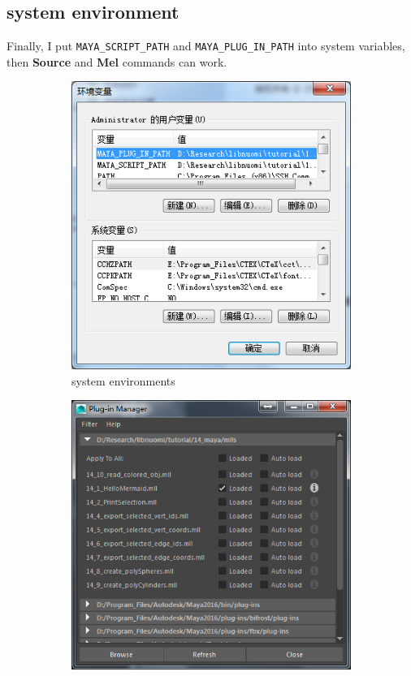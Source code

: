 \subsection{system environment}
Finally, I put \lstinline|MAYA_SCRIPT_PATH| and \lstinline|MAYA_PLUG_IN_PATH| into system variables, then \textbf{Source} and \textbf{Mel} commands can work.

\begin{figure}[tbh]
	\centering
	\begin{subfigure}[b]{0.45\textwidth}
		\includegraphics[width=\linewidth]{figures/Mel/system_env}
		\caption{system environments}
		\label{fig:systemenv}
	\end{subfigure}
	\begin{subfigure}[b]{0.45\textwidth}
		\includegraphics[width=\linewidth]{figures/Mel/all_plugins}

\end{subfigure}
\end{figure}
